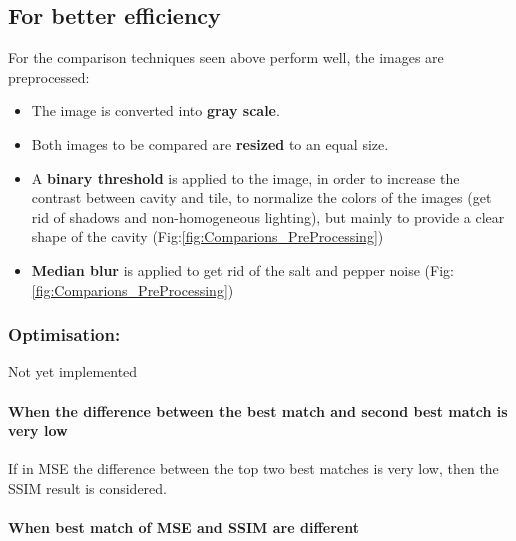 \documentclass{article}
\begin{document}
\subsection*{For better efficiency}
For the comparison techniques seen above perform well, the images are preprocessed:
\begin{itemize}
\item The image is converted into \textbf{gray scale}. 
\item Both images to be compared are \textbf{resized} to an equal size.
\item A \textbf{binary threshold} is applied to the image, in order to increase the contrast between cavity and tile, to normalize the colors of the images (get rid of shadows and non-homogeneous lighting), but mainly to provide a clear shape of the cavity (Fig:\ref{fig:Comparions_PreProcessing})
\item \textbf{Median blur} is applied to get rid of the salt and pepper noise (Fig:\ref{fig:Comparions_PreProcessing})
\end{itemize}

\subsubsection*{Optimisation:}

Not yet implemented

\paragraph*{When the difference between the best match and second best match is very low}

If in MSE the difference between the top two best matches is very low, then the SSIM result is considered.

\paragraph*{When best match of MSE and SSIM are different}
\end{document}
